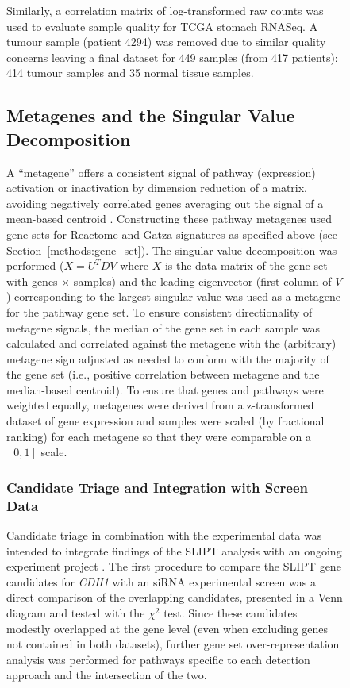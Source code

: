 \begin{figure}[!htp]
Similarly, a correlation matrix of log-transformed raw counts was used to evaluate sample quality for TCGA stomach RNASeq. A tumour sample (patient 4294) was removed due to similar quality concerns leaving a final dataset for 449 samples (from 417 patients): 414 tumour samples and 35 normal tissue samples.

\subsection{Metagenes and the Singular Value Decomposition} \label{methods:metagene}
A ``metagene'' offers a consistent signal of pathway (expression) activation or inactivation by dimension reduction of a matrix, avoiding negatively correlated genes averaging out the signal of a mean-based centroid \citep{Huang2003}. Constructing these pathway metagenes used gene sets for Reactome and Gatza signatures \citep{Gatza2011, Gatza2014} as specified above (see Section~\ref{methods:gene_set}). The singular-value decomposition was performed ($X = U^{T} D V$ where $X$ is the data matrix of the gene set with genes $\times$ samples) and the leading eigenvector (first column of $V$) corresponding to the largest singular value was used as a metagene for the pathway gene set. To ensure consistent directionality of metagene signals, the median of the gene set in each sample was calculated and correlated against the metagene with the (arbitrary) metagene sign adjusted as needed to conform with the majority of the gene set (i.e., positive correlation between metagene and the median-based centroid). To ensure that genes and pathways were weighted equally, metagenes were derived from a z-transformed dataset of gene expression and samples were scaled (by fractional ranking) for each metagene so that they were comparable on a $[0,1]$ scale. 

\subsubsection{Candidate Triage and Integration with Screen Data} \label{methods:venn_analysis}
Candidate triage in combination with the experimental data was intended to integrate findings of the SLIPT analysis with an ongoing experiment project \citep{Chen2014, Telford2015}. The first procedure to compare the SLIPT gene candidates for \textit{CDH1} with an siRNA experimental screen \citep{Telford2015} was a direct comparison of the overlapping candidates, presented in a Venn diagram and tested with the $\chi^2$ test. Since these candidates modestly overlapped at the gene level (even when excluding genes not contained in both datasets), further gene set over-representation analysis was performed for pathways specific to each detection approach and the intersection of the two.


\end{figure}
